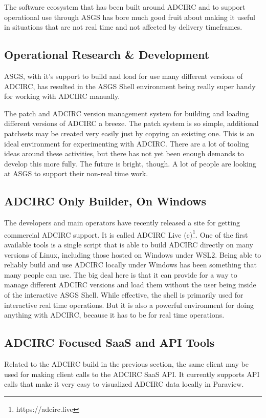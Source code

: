 \documentclass{article}
\begin{document}
The software ecosystem that has been built around ADCIRC and to support
operational use through ASGS has bore much good fruit about making it useful in
situations that are not real time and not affected by delivery timeframes.

\subsection{Operational Research \& Development}

ASGS, with it's support to build and load for use many different versions of
ADCIRC, has resulted in the ASGS Shell environment being really super handy for
working with ADCIRC manually.

The patch and ADCIRC version management system for building and loading
different versions of ADCIRC a breeze. The patch system is so simple, additional
patchsets may be created very easily just by copying an existing one. This is an
ideal environment for experimenting with ADCIRC. There are a lot of tooling
ideas around these activities, but there has not yet been enough demands to
develop this more fully. The future is bright, though. A lot of people are
looking at ASGS to support their non-real time work.

\subsection{ADCIRC Only Builder, On Windows}

The developers and main operators have recently released a site for getting
commercial ADCIRC support. It is called ADCIRC Live
(c)\footnote{https://adcirc.live}. One of the first available tools is a
single script that is able to build ADCIRC directly on many versions of Linux,
including those hosted on Windows under WSL2. Being able to reliably build and
use ADCIRC locally under Windows has been something that many people can use.
The big deal here is that it can provide for a way to manage different ADCIRC
versions and load them without the user being inside of the interactive ASGS
Shell. While effective, the shell is primarily used for interactive real time
operations. But it is also a powerful environment for doing anything with
ADCIRC, because it has to be for real time operations.

\subsection{ADCIRC Focused SaaS and API Tools} Related to the ADCIRC build in
the previous section, the same client may be used for making client calls to the
ADCIRC SaaS API. It currently supports API calls that make it very easy to
visualized ADCIRC data locally in Paraview.
\end{document}

